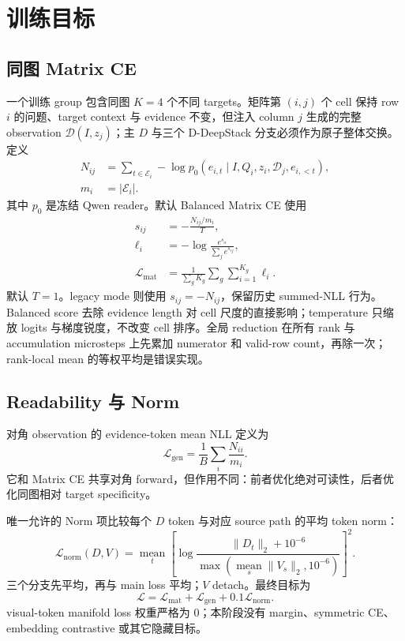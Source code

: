 \documentclass[UTF8,twocolumn,10pt,a4paper]{ctexart}
\begin{document}
\section{训练目标}
\subsection{同图 Matrix CE}
一个训练 group 包含同图 $K=4$ 个不同 targets。矩阵第 $(i,j)$ 个 cell 保持 row $i$ 的问题、target context 与 evidence 不变，但注入 column $j$ 生成的完整 observation $\mathcal D(I,z_j)$；主 $D$ 与三个 D-DeepStack 分支必须作为原子整体交换。定义
\begin{align}
  N_{ij}&=\sum_{t\in\mathcal E_i}-\log p_0(e_{i,t}\mid I,Q_i,z_i,\mathcal D_j,e_{i,<t}),\\
  m_i&=|\mathcal E_i|.
\end{align}
其中 $p_0$ 是冻结 Qwen reader。默认 Balanced Matrix CE 使用
\begin{equation}
\begin{aligned}
  s_{ij}&=-\frac{N_{ij}/m_i}{T},\\
  \ell_i&=-\log\frac{e^{s_{ii}}}{\sum_j e^{s_{ij}}},\\
  \mathcal L_{\mathrm{mat}}
  &=\frac{1}{\sum_g K_g}\sum_g\sum_{i=1}^{K_g}\ell_i.
\end{aligned}
  \label{eq:matrix}
\end{equation}
默认 $T=1$。legacy mode 则使用 $s_{ij}=-N_{ij}$，保留历史 summed-NLL 行为。Balanced score 去除 evidence length 对 cell 尺度的直接影响；temperature 只缩放 logits 与梯度锐度，不改变 cell 排序。全局 reduction 在所有 rank 与 accumulation microsteps 上先累加 numerator 和 valid-row count，再除一次；rank-local mean 的等权平均是错误实现。

\subsection{Readability 与 Norm}
对角 observation 的 evidence-token mean NLL 定义为
\begin{equation}
  \mathcal L_{\mathrm{gen}}
  =\frac{1}{B}\sum_i\frac{N_{ii}}{m_i}.
  \label{eq:lgen}
\end{equation}
它和 Matrix CE 共享对角 forward，但作用不同：前者优化绝对可读性，后者优化同图相对 target specificity。

唯一允许的 Norm 项比较每个 $D$ token 与对应 source path 的平均 token norm：
\begin{equation}
  \mathcal L_{\mathrm{norm}}(D,V)=
  \operatorname*{mean}_t
  \left[
  \log\frac{\lVert D_t\rVert_2+10^{-6}}
  {\max(\underset{s}{\operatorname{mean}}\lVert V_s\rVert_2,10^{-6})}
  \right]^2.
  \label{eq:norm}
\end{equation}
三个分支先平均，再与 main loss 平均；$V$ detach。最终目标为
\begin{equation}
  \mathcal L=\mathcal L_{\mathrm{mat}}
  +\mathcal L_{\mathrm{gen}}+0.1\mathcal L_{\mathrm{norm}}.
\end{equation}
visual-token manifold loss 权重严格为 0；本阶段没有 margin、symmetric CE、embedding contrastive 或其它隐藏目标。
\end{document}
